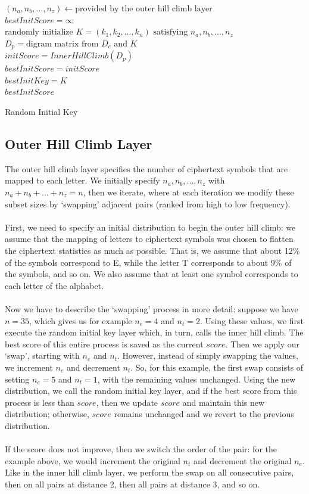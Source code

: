 \documentclass[Lau,binding=0.6cm,oneside]{sapthesis}
\begin{document}
\begin{algorithm}
	$(n_a, n_b,..., n_z) \gets \text{provided by the outer hill climb layer}$\\
	$bestInitScore = \infty$\\
	{
		$\text{randomly initialize } K = (k_1, k_2,..., k_n) \text{ satisfying } n_a, n_b, ..., n_z$\\
		$D_p = \text{digram matrix from } D_c \text{ and } K$\\
		$initScore = InnerHillClimb(D_p)$\\
		{
			$bestInitScore = initScore$\\
			$bestInitKey = K$\\
		}
	}
	\Return $bestInitScore$
	\caption{Random Initial Key}
\end{algorithm}

\subsection{Outer Hill Climb Layer}
The outer hill climb layer specifies the number of ciphertext symbols that are mapped to each letter. We initially specify $n_a, n_b, ..., n_z$ with $n_a + n_b + ... + n_z = n$, then we iterate, where at each iteration we modify these subset sizes by `swapping' adjacent pairs (ranked from high to low frequency).\\\\
First, we need to specify an initial distribution to begin the outer hill climb: we assume that the mapping of letters to ciphertext symbols was chosen to flatten the ciphertext statistics as much as possible. That is, we assume that about 12\% of the symbols correspond to \textsf{E}, while the letter \textsf{T} corresponds to about 9\% of the symbols, and so on. We also assume that at least one symbol corresponds to each letter of the alphabet.\\\\
Now we have to describe the `swapping' process in more detail: suppose we have $n=35$, which gives us for example $n_e = 4$ and $n_t = 2$. Using these values, we first execute the random initial key layer which, in turn, calls the inner hill climb. The best score of this entire process is saved as the current $score$. Then we apply our `swap', starting with $n_e$ and $n_t$. However, instead of simply swapping the values, we increment $n_e$ and decrement $n_t$. So, for this example, the first swap consists of setting $n_e = 5$ and $n_t = 1$, with the remaining values unchanged. Using the new distribution, we call the random initial key layer, and if the best score from this process is less than $score$, then we update $score$ and maintain this new distribution; otherwise, $score$ remains unchanged and we revert to the previous distribution.\\\\
If the score does not improve, then we switch the order of the pair: for the example above, we would increment the original $n_t$ and decrement the original $n_e$. Like in the inner hill climb layer, we perform the swap on all consecutive pairs, then on all pairs at distance 2, then all pairs at distance 3, and so on.\\
\end{document}
